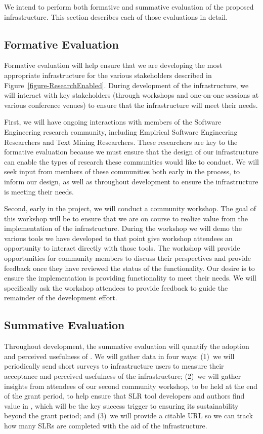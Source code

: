 We intend to perform both formative and summative evaluation of the proposed infrastructure. 
This section describes each of those evaluations in detail.
\vspace{8pt}

\subsection{Formative Evaluation}
Formative evaluation will help ensure that we are developing the most appropriate infrastructure for the various stakeholders described in Figure~\ref{figure-ResearchEnabled}.
During development of the infrastructure, we will interact with key stakeholders (through workshops and one-on-one sessions at various conference venues) to ensure that the infrastructure will meet their needs.

First, we will have ongoing interactions with members of the Software Engineering research community, including Empirical Software Engineering Researchers and Text Mining Researchers.
These researchers are key to the formative evaluation because we must ensure that the design of our infrastructure can enable the types of research these communities would like to conduct.
We will seek input from members of these communities both early in the process, to inform our design, as well as throughout development to ensure the infrastructure is meeting their needs.

Second, early in the project, we will conduct a community workshop. 
The goal of this workshop will be to ensure that we are on course to realize value from the implementation of the {\IT} infrastructure. 
During the workshop we will demo the various tools we have developed to that point give workshop attendees an opportunity to interact directly with those tools. 
The workshop will provide opportunities for community members to discuss their perspectives and provide feedback once they have reviewed the status of the {\IT} functionality.  
Our desire is to ensure the implementation is providing functionality to meet their needs.
We will specifically ask the workshop attendees to provide feedback to guide the remainder of the development effort.
\vspace{8pt}

\subsection{Summative Evaluation}
Throughout development, the summative evaluation will quantify the adoption and perceived usefulness of {\IT}.
We will gather data in four ways:
(1)~we will periodically send short surveys to infrastructure users to measure their acceptance and perceived usefulness of the infrastructure;
(2)~we will gather insights from attendees of our second community workshop, to be held at the end of the grant period, to help ensure that SLR tool developers and authors find value in {\IT}, which will be the key success trigger to ensuring its sustainability beyond the grant period; and
(3)~we will provide a citable URL so we can track how many SLRs are completed with the aid of the infrastructure. 

